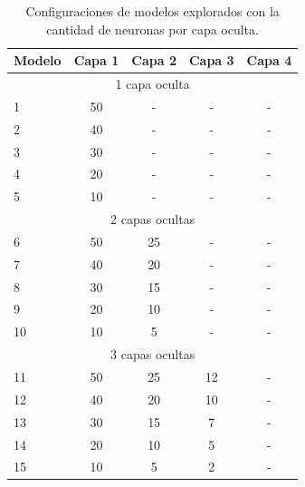\begin{table}[H]
	\centering
	\caption[Configuraciones de modelos explorados]{Configuraciones de modelos explorados con la cantidad de neuronas por capa oculta.}
	\begin{tabular}{l c c c c}    
		\toprule
		\textbf{Modelo} & \textbf{Capa 1} & \textbf{Capa 2} & \textbf{Capa 3} & \textbf{Capa 4} \\
		\midrule
    \multicolumn{5}{c}{1 capa oculta} \\
    \hline
		1                & 50             & -			          & -               & -	\\
    2                & 40             & -			          & -               & -	\\
    3                & 30             & -			          & -               & -	\\
    4                & 20             & -			          & -               & -	\\
    5                & 10             & -			          & -               & -	\\

    \hline
    \multicolumn{5}{c}{2 capas ocultas} \\
    \hline

    6                & 50             & 25			        & -               & -	\\
    7                & 40             & 20			        & -               & -	\\
    8                & 30             & 15			        & -               & -	\\
    9                & 20             & 10			        & -               & -	\\
    10               & 10             & 5			          & -               & -	\\

    \hline
    \multicolumn{5}{c}{3 capas ocultas} \\
    \hline

    11               & 50             & 25			        & 12              & -	\\
    12               & 40             & 20			        & 10              & -	\\
    13               & 30             & 15			        & 7               & -	\\
    14               & 20             & 10			        & 5               & -	\\
    15               & 10             & 5			          & 2               & -	\\


\end{tabular}
\end{table}
